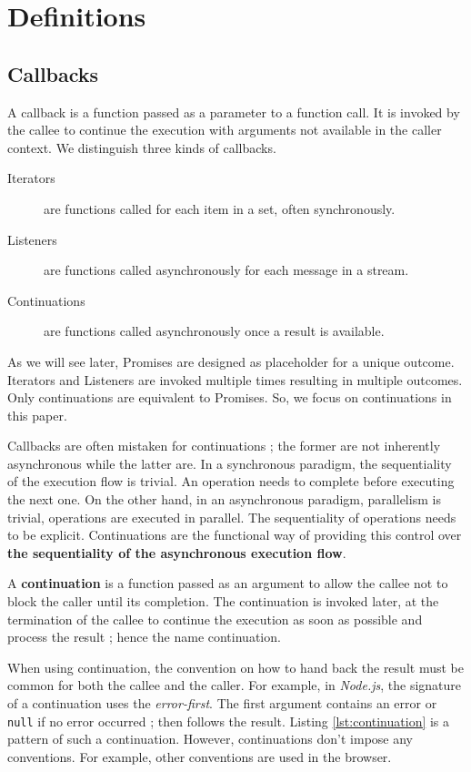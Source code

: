 \section{Definitions} \label{section:definitions}

\subsection{Callbacks} \label{section:definitions:continuation}

A callback is a function passed as a parameter to a function call.
It is invoked by the callee to continue the execution with arguments not available in the caller context.
We distinguish three kinds of callbacks.

\begin{description}
  \item[Iterators] are functions called for each item in a set, often synchronously.
  \item[Listeners] are functions called asynchronously for each message in a stream.
  \item[Continuations] are functions called asynchronously once a result is available.
\end{description}

As we will see later, Promises are designed as placeholder for a unique outcome.
Iterators and Listeners are invoked multiple times resulting in multiple outcomes.
Only continuations are equivalent to Promises.
So, we focus on continuations in this paper.

Callbacks are often mistaken for continuations ; the former are not inherently asynchronous while the latter are.
In a synchronous paradigm, the sequentiality of the execution flow is trivial.
An operation needs to complete before executing the next one.
On the other hand, in an asynchronous paradigm, parallelism is trivial, operations are executed in parallel.
The sequentiality of operations needs to be explicit.
Continuations are the functional way of providing this control over \textbf{the sequentiality of the asynchronous execution flow}.

A \textbf{continuation} is a function passed as an argument to allow the callee not to block the caller until its completion.
The continuation is invoked later, at the termination of the callee to continue the execution as soon as possible and process the result ; hence the name continuation.

When using continuation, the convention on how to hand back the result must be common for both the callee and the caller.
For example, in \textit{Node.js}, the signature of a continuation uses the \textit{error-first}.
The first argument contains an error or \texttt{null} if no error occurred ; then follows the result.
Listing \ref{lst:continuation} is a pattern of such a continuation.
However, continuations don't impose any conventions.
For example, other conventions are used in the browser.

